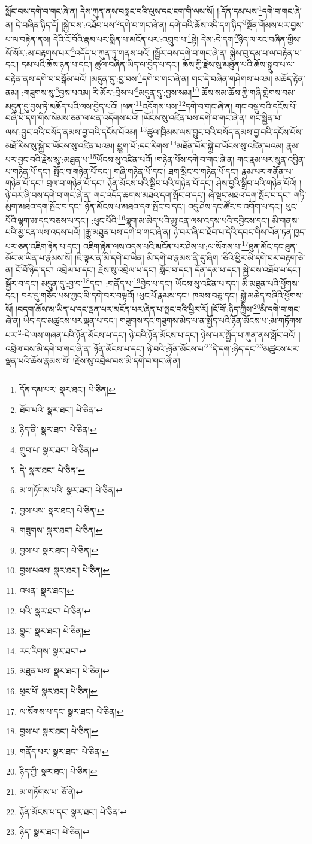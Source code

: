 སློང་བས་དགེ་བ་གང་ཞེ་ན། དེས་ཀུན་ནས་བསླང་བའི་ལུས་དང་ངག་གི་ལས་སོ། །:དོན་དམ་པས་\footnote{དོན་དམ་པར་  སྣར་ཐང་།  པེ་ཅིན། }དགེ་བ་གང་ཞེ་ན། དེ་བཞིན་ཉིད་དོ། །སྐྱེ་བས་:འཐོབ་པས་\footnote{ཐོབ་པའི་  སྣར་ཐང་།  པེ་ཅིན། }དགེ་བ་གང་ཞེ་ན། དགེ་བའི་ཆོས་འདི་དག་ཉིད་\footnote{ཉིད་ནི་  སྣར་ཐང་།  པེ་ཅིན། }སྔོན་གོམས་པར་བྱས་པ་ལ་བརྟེན་ནས། དེའི་ངོ་བོའི་རྣམ་པར་སྨིན་པ་མངོན་པར་:འགྲུབ་པ་\footnote{གྲུབ་པ་  སྣར་ཐང་།  པེ་ཅིན། }སྟེ། དེས་:དེ་དག་\footnote{དེ་  སྣར་ཐང་།  པེ་ཅིན། }ཉིད་ལ་རང་བཞིན་གྱིས་སོ་སོར་:མ་བརྟགས་པར་\footnote{མ་གཏོགས་པའི་  སྣར་ཐང་།  པེ་ཅིན། }འདོད་པ་ཀུན་ཏུ་གནས་པའོ། །སྦྱོར་བས་དགེ་བ་གང་ཞེ་ན། སྐྱེས་བུ་དམ་པ་ལ་བརྟེན་པ་དང་། དམ་པའི་ཆོས་ཉན་པ་དང་། ཚུལ་བཞིན་ཡིད་ལ་བྱེད་པ་དང་། ཆོས་ཀྱི་རྗེས་སུ་མཐུན་པའི་ཆོས་སྒྲུབ་པ་ལ་བརྟེན་ནས་དགེ་བ་བསྒོམ་པའོ། །མདུན་དུ་:བྱ་བས་\footnote{བྱས་པས་  སྣར་ཐང་།  པེ་ཅིན། }དགེ་བ་གང་ཞེ་ན། གང་དེ་བཞིན་གཤེགས་པའམ། མཆོད་རྟེན་ནམ། :གཟུགས་སུ་\footnote{གཟུགས་  སྣར་ཐང་།  པེ་ཅིན། }བྱས་པའམ། རི་མོར་:བྲིས་པ་\footnote{བྱས་པ་  སྣར་ཐང་།  པེ་ཅིན། }མདུན་དུ་:བྱས་སམ།\footnote{བྱས་པའམ།  སྣར་ཐང་།  པེ་ཅིན། } ཆོས་སམ་ཆོས་ཀྱི་གཞི་གླེགས་བམ་མདུན་དུ་བྱས་ཏེ་མཆོད་པའི་ལས་བྱེད་པའོ། །ཕན་\footnote{འཕན་  སྣར་ཐང་། }འདོགས་པས་\footnote{པའི་  སྣར་ཐང་།  པེ་ཅིན། }དགེ་བ་གང་ཞེ་ན། གང་བསྡུ་བའི་དངོས་པོ་བཞི་པོ་དག་གིས་སེམས་ཅན་ལ་ཕན་འདོགས་པའོ། །ཡོངས་སུ་འཛིན་པས་དགེ་བ་གང་ཞེ་ན། གང་སྦྱིན་པ་ལས་:བྱུང་བའི་བསོད་ནམས་བྱ་བའི་དངོས་པོའམ། \footnote{བྱུང་  སྣར་ཐང་།  པེ་ཅིན། }ཚུལ་ཁྲིམས་ལས་བྱུང་བའི་བསོད་ནམས་བྱ་བའི་དངོས་པོས་མཐོ་རིས་སུ་སྐྱེ་བ་ཡོངས་སུ་འཛིན་པའམ། ཕྱུག་པོ་:དང་རིགས་\footnote{རང་རིགས་  སྣར་ཐང་། }མཐོན་པོར་སྐྱེ་བ་ཡོངས་སུ་འཛིན་པའམ། རྣམ་པར་བྱང་བའི་རྗེས་སུ་:མཐུན་པ་\footnote{མཐུན་པས་  སྣར་ཐང་།  པེ་ཅིན། }ཡོངས་སུ་འཛིན་པའོ། །གཉེན་པོས་དགེ་བ་གང་ཞེ་ན། གང་རྣམ་པར་སུན་འབྱིན་པ་གཉེན་པོ་དང་། སྤོང་བ་གཉེན་པོ་དང་། གཞི་གཉེན་པོ་དང་། ཐག་སྲིང་བ་གཉེན་པོ་དང་། རྣམ་པར་གནོན་པ་གཉེན་པོ་དང་། བྲལ་བ་གཉེན་པོ་དང་། ཉོན་མོངས་པའི་སྒྲིབ་པའི་གཉེན་པོ་དང་། ཤེས་བྱའི་སྒྲིབ་པའི་གཉེན་པོའོ། །ཉེ་བར་ཞི་བས་དགེ་བ་གང་ཞེ་ན། གང་འདོད་ཆགས་མཐའ་དག་སྤོང་བ་དང་། ཞེ་སྡང་མཐའ་དག་སྤོང་བ་དང་། གཏི་མུག་མཐའ་དག་སྤོང་བ་དང་། ཉོན་མོངས་པ་མཐའ་དག་སྤོང་བ་དང་། འདུ་ཤེས་དང་ཚོར་བ་འགོག་པ་དང་། ཕུང་པོའི་ལྷག་མ་དང་བཅས་པ་དང་། :ཕུང་པོའི་\footnote{ཕུང་པོ་  སྣར་ཐང་།  པེ་ཅིན། }ལྷག་མ་མེད་པའི་མྱ་ངན་ལས་འདས་པའི་དབྱིངས་དང་། མི་གནས་པའི་མྱ་ངན་ལས་འདས་པའོ། །རྒྱུ་མཐུན་པས་དགེ་བ་གང་ཞེ་ན། ཉེ་བར་ཞི་བ་ཐོབ་པ་དེའི་དབང་གིས་ཡོན་ཏན་ཁྱད་པར་ཅན་འཇིག་རྟེན་པ་དང་། འཇིག་རྟེན་ལས་འདས་པའི་མངོན་པར་ཤེས་པ་:ལ་སོགས་པ་\footnote{ལ་སོགས་པ་དང་  སྣར་ཐང་།  པེ་ཅིན། }ཐུན་མོང་དང་ཐུན་མོང་མ་ཡིན་པ་རྣམས་སོ། །ཇི་ལྟར་ན་མི་དགེ་བ་ཡིན། མི་དགེ་བ་རྣམས་ནི་དུ་ཞིག །ཅིའི་ཕྱིར་མི་དགེ་བར་བརྟག་ཅེ་ན། ངོ་བོ་ཉིད་དང་། འབྲེལ་པ་དང་། རྗེས་སུ་འབྲེལ་པ་དང་། སློང་བ་དང་། དོན་དམ་པ་དང་། སྐྱེ་བས་འཐོབ་པ་དང་། སྦྱོར་བ་དང་། མདུན་དུ་:བྱ་བ་\footnote{བྱས་པ་  སྣར་ཐང་།  པེ་ཅིན། }དང་། :གནོད་པ་\footnote{གནོད་པར་  སྣར་ཐང་།  པེ་ཅིན། }བྱེད་པ་དང་། ཡོངས་སུ་འཛིན་པ་དང་། མི་མཐུན་པའི་ཕྱོགས་དང་། བར་དུ་གཅོད་པས་ཀྱང་མི་དགེ་བར་བལྟའོ། །ཕུང་པོ་རྣམས་དང་། ཁམས་བཅུ་དང་། སྐྱེ་མཆེད་བཞིའི་ཕྱོགས་སོ། །བདག་ཆོས་མ་ཡིན་པ་དང་ལྡན་པར་མངོན་པར་ཞེན་པ་སྤང་བའི་ཕྱིར་རོ། །ངོ་བོ་:ཉིད་ཀྱིས་\footnote{ཉིད་ཀྱི་  སྣར་ཐང་།  པེ་ཅིན། }མི་དགེ་བ་གང་ཞེ་ན། ཡིད་དང་མཚུངས་པར་ལྡན་པ་དང་། གཟུགས་དང་གཟུགས་མེད་པ་ན་སྤྱོད་པའི་ཉོན་མོངས་པ་:མ་གཏོགས་པར་\footnote{མ་གཏོགས་པ་  ཅོ་ནེ། }དེ་ལས་གཞན་པའི་ཉོན་མོངས་པ་དང་། ཉེ་བའི་ཉོན་མོངས་པ་དང་། ཉེས་པར་སྤྱོད་པ་ཀུན་ནས་སློང་བའོ། །འབྲེལ་བས་མི་དགེ་བ་གང་ཞེ་ན། ཉོན་མོངས་པ་དང་། ཉེ་བའི་:ཉོན་མོངས་པ་\footnote{ཉོན་མོངས་པ་དང་  སྣར་ཐང་།  པེ་ཅིན། }དེ་དག་:ཉིད་དང་\footnote{ཉིད་  སྣར་ཐང་།  པེ་ཅིན། }མཚུངས་པར་ལྡན་པའི་ཆོས་རྣམས་སོ། །རྗེས་སུ་འབྲེལ་བས་མི་དགེ་བ་གང་ཞེ་ན། 